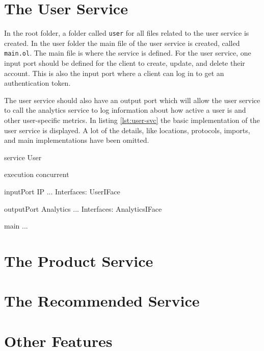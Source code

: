 \section{The User Service}
In the root folder, a folder called \texttt{user} for all files related to the user service is created.
In the user folder the main file of the user service is created, called \texttt{main.ol}. The main file is where the service is defined.
For the user service, one input port should be defined for the client to create, update, and delete their account. This is also the input port where a client can log in to get an authentication token.

The user service should also have an output port which will allow the user service to call the analytics service to log information about how active a user is and other user-specific metrics.
In listing \ref*{lst:user-svc} the basic implementation of the user service is displayed. A lot of the details, like locations, protocols, imports, and main implementations have been omitted.
\begin{jolisting}[][caption={The user service with omitted implementation details.}, label={lst:user-svc}]
service User {

    execution{ concurrent }

    inputPort IP {
        ...
        Interfaces: UserIFace
    }

    outputPort Analytics {
        ...
        Interfaces: AnalyticsIFace
    }

    main {
        ...
    }
}
\end{jolisting}

\section{The Product Service}
\section{The Recommended Service}

\section{Other Features}